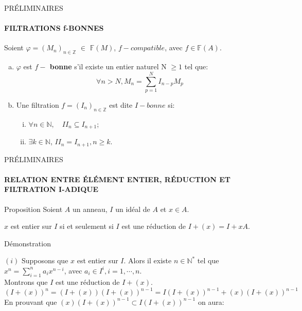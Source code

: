 \documentclass[11pt,a4paper]{beamer}
\begin{document}
	\begin{frame}{PRÉLIMINAIRES}
		\framesubtitle{FILTRATIONS f-BONNES}
		\begin{block}{}
			Soient $\varphi=(M_n)_{n \in \mathbb{Z}}$ $\in$ $\mathbb{F}(M)$, $f-compatible$, avec $f \in \mathbb{F}(A)$.
			\begin{enumerate}[(a)]
				\item $\varphi$ est \textbf{$f-$ bonne} s'il existe un entier naturel N $\geqslant 1$ tel que:
				\[\forall n > N, M_{n}=\sum_{p=1}^{N}I_{n-p}M_{p} \]
				\item Une filtration $f=(I_n)_{n \in \mathbb{Z}}$ est dite $I-bonne$ si: 
				\begin{enumerate}[(i)]
					\item $\forall n \in \mathbb{N}, \quad II_n \subseteq I_{n+1}$;
					\item $\exists k \in \mathbb{N}$, $II_n = I_{n+1}, n\geqslant k$.
				\end{enumerate}
			\end{enumerate}
		\end{block}
	\end{frame}
	
		\begin{frame}{PRÉLIMINAIRES}
		\framesubtitle{RELATION ENTRE ÉLÉMENT ENTIER, RÉDUCTION ET FILTRATION I-ADIQUE}
		\begin{block}{Proposition}
				Soient $A$ un anneau, $I$ un idéal de $A$ et $x \in A$.
				\begin{center}
					$x$ est entier sur $I$ si et seulement si $I$ est une réduction de $I + (x) = I +xA $.
				\end{center}
		\end{block}
	\end{frame}
			\begin{frame}{Démonstration}
		\begin{block}{}
	$(i)$ Supposons que $x$ est entier sur $I$. Alors il existe $n \in \mathbb{N^*}$ tel que $x^n = \displaystyle \sum_{i=1}^{n}{a_i x^{n-i}}$, avec $a_i \in I^i, i=1, \cdots ,n$.\\
	Montrons que $I$ est une réduction de $I + (x)$.\\
	$(I+(x))^n = (I+(x))(I+(x))^{n-1}= I(I+(x))^{n-1} + (x)(I+(x))^{n-1}$\\
	En prouvant que $(x)(I+(x))^{n-1} \subset I(I+(x))^{n-1}$ on aura:
		\end{block}
	\end{frame}
	
\end{document}
